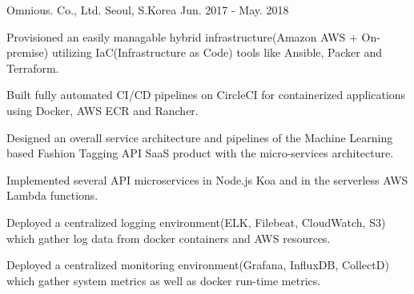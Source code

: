 \begin{cventries}
  \cventry
    {} %
    {Omnious. Co., Ltd.} %
    {Seoul, S.Korea} %
    {Jun. 2017 - May. 2018} %
    {
      \begin{cvitems} %
        \item {Provisioned an easily managable hybrid infrastructure(Amazon AWS + On-premise) utilizing IaC(Infrastructure as Code) tools like Ansible, Packer and Terraform.}
        \item {Built fully automated CI/CD pipelines on CircleCI for containerized applications using Docker, AWS ECR and Rancher.}
        \item {Designed an overall service architecture and pipelines of the Machine Learning based Fashion Tagging API SaaS product with the micro-services architecture.}
        \item {Implemented several API microservices in Node.js Koa and in the serverless AWS Lambda functions.}
        \item {Deployed a centralized logging environment(ELK, Filebeat, CloudWatch, S3) which gather log data from docker containers and AWS resources.}
        \item {Deployed a centralized monitoring environment(Grafana, InfluxDB, CollectD) which gather system metrics as well as docker run-time metrics.}
      \end{cvitems}
    }

\end{cventries}
